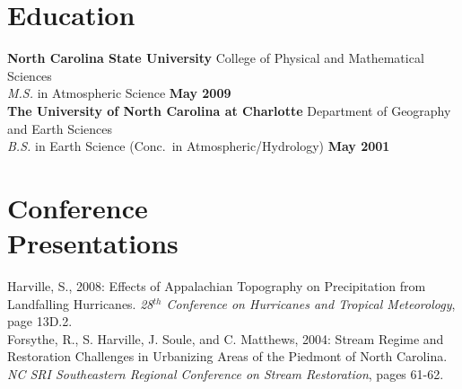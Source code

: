 \documentclass[margin,line]{resume}
\begin{document}
\begin{resume}
\section{\mysidestyle Education}

\textbf{North Carolina State University} College of Physical and Mathematical Sciences\\
\textsl{M.S.} in Atmospheric Science \hfill \textbf{May 2009}\vspace{3mm}\\
\textbf{The University of North Carolina at Charlotte} Department of Geography and Earth Sciences\\
\textsl{B.S.} in Earth Science (Conc.\ in Atmospheric/Hydrology) \hfill \textbf{May 2001}



\section{\mysidestyle Conference\\Presentations}

Harville, S., 2008:  Effects of Appalachian Topography on Precipitation from Landfalling Hurricanes.  \textit{28$^{th}$ Conference on Hurricanes and Tropical Meteorology}, page 13D.2.
\vspace{2mm}\\
Forsythe, R., S. Harville, J. Soule, and C. Matthews, 2004:  Stream Regime and Restoration Challenges in Urbanizing Areas of the Piedmont of North Carolina.  \textit{NC SRI Southeastern Regional Conference on Stream Restoration}, pages 61-62.






\end{resume}
\end{document}
